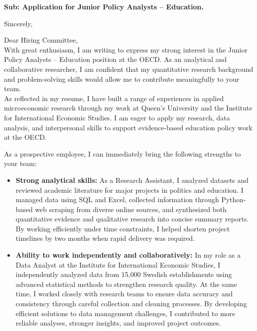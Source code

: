 \documentclass[11pt,a4paper,roman]{moderncv}
\begin{document}
\date{\today}
\opening{\textbf{Sub: Application for Junior Policy Analysts – Education.}}
\closing{Sincerely, \vspace{-1em}}


\makelettertitle



Dear Hiring Committee,
\\
\vspace{1em}
With great enthusiasm, I am writing to express my strong interest in the Junior Policy Analysts – Education position at the OECD. As an analytical and collaborative researcher, I am confident that my quantitative research background and problem-solving skills would allow me to contribute meaningfully to your team.\\

\vspace{1em}
As reflected in my resume, I have built a range of experiences in applied microeconomic research through my work at Queen's University and the Institute for International Economic Studies. I am eager to apply my research, data analysis, and interpersonal skills to support evidence-based education policy work at the OECD.\\
\vspace{1em}

As a prospective employee, I can immediately bring the following strengths to your team:
\vspace{0.5em}
\begin{itemize}
\item \textbf{Strong analytical skills:} As a Research Assistant, I analyzed datasets and reviewed academic literature for major projects in politics and education. I managed data using SQL and Excel, collected information through Python-based web scraping from diverse online sources, and synthesized both quantitative evidence and qualitative research into concise summary reports. By working efficiently under time constraints, I helped shorten project timelines by two months when rapid delivery was required.
\item \textbf{Ability to work independently and collaboratively:} In my role as a Data Analyst at the Institute for International Economic Studies, I independently analyzed data from 15,000 Swedish establishments using advanced statistical methods to strengthen research quality. At the same time, I worked closely with research teams to ensure data accuracy and consistency through careful collection and cleaning processes. By developing efficient solutions to data management challenges, I contributed to more reliable analyses, stronger insights, and improved project outcomes.
\end{itemize}
\end{document}
